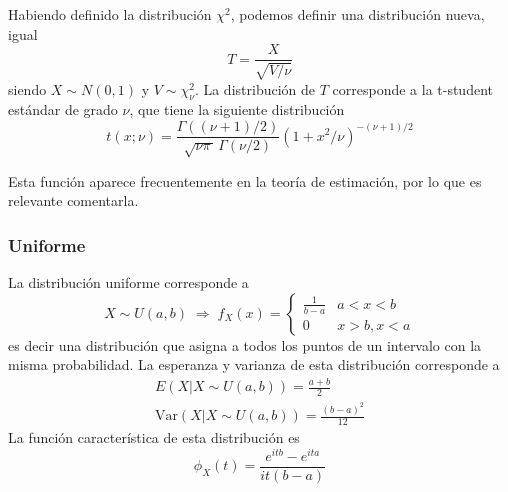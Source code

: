 \documentclass{article}
\numberwithin{equation}{section} %
\begin{document}
Habiendo definido la distribución $\chi^2$, podemos definir una distribución nueva, igual 
\begin{equation}
T = \frac{X}{\sqrt{V/\nu}}
\end{equation}
siendo $X \sim N(0,1)$ y $V \sim \chi^2_{\nu}$. La distribución de $T$ corresponde a la t-student estándar de grado $\nu$, que tiene la siguiente distribución
\begin{equation}
t(x;\nu) = \frac{\Gamma((\nu+1)/2)}{\sqrt{\nu\pi\,}\,\Gamma(\nu/2)} (1+x^2/\nu)^{-(\nu+1)/2}
\end{equation}

Esta función aparece frecuentemente en la teoría de estimación, por lo que es relevante comentarla.
\subsubsection{Uniforme}
La distribución uniforme corresponde a 
\begin{equation}
X \sim U(a, b) \; \Rightarrow \; f_X(x) = \begin{cases} \frac{1}{b - a} & a < x < b \\ 0 & x > b, x < a \end{cases}
\end{equation}
es decir una distribución que asigna a todos los puntos de un intervalo con la misma probabilidad. La esperanza y varianza de esta distribución corresponde a 
\begin{equation}
\begin{gathered}
E(X|X\sim U(a,b)) = \frac{a + b}{2}\\
\text{Var}(X|X\sim U(a,b)) = \frac{(b - a)^2}{12}
\end{gathered}
\end{equation}
La función característica de esta distribución es
\begin{equation}
\phi_X(t) = \frac{e^{itb}-e^{ita}}{it(b-a)}
\end{equation}
\end{document}
